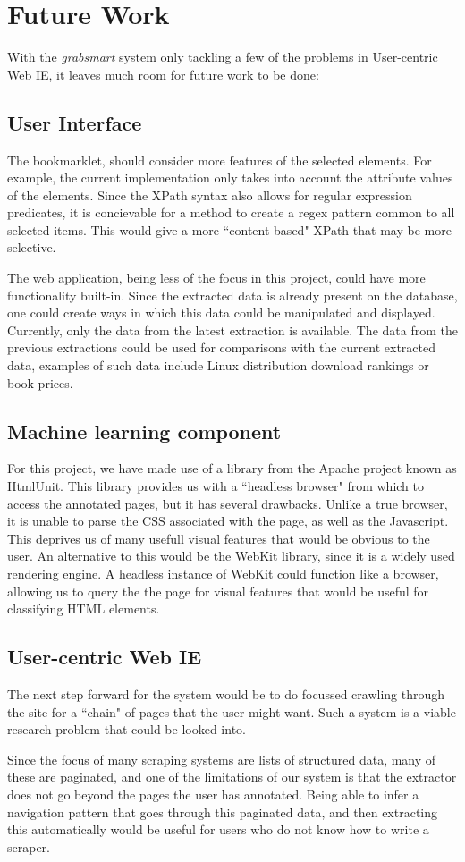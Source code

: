 \section{Future Work}
With the \textit{grabsmart} system only tackling a few of the problems in User-centric Web IE,
it leaves much room for future work to be done:

\subsection{User Interface}
The  bookmarklet, should consider more
features of the selected elements. For example, the current implementation only takes into 
account the attribute values of the elements. Since the XPath syntax also allows for 
regular expression predicates, it is concievable for a method to create
a regex pattern common to all selected items. This would give a more ``content-based" XPath
that may be more selective.

The web application, being less of the focus in this project, could have more functionality
built-in. Since the extracted data is already present on the database, one could create
ways in which this data could be manipulated and displayed. Currently, only the data from
the latest extraction is available. The data from the previous extractions could be used 
for comparisons with the current extracted data, examples of such data include Linux
distribution download rankings or book prices.

\subsection{Machine learning component}
For this project, we have made use of a library from the Apache project known as HtmlUnit.
This library provides us with a ``headless browser" from which to access the annotated pages,
but it has several drawbacks. Unlike a true browser, it is unable to parse the CSS associated
with the page, as well as the Javascript. This deprives us of many usefull visual features
that would be obvious to the user. An alternative to this would be the WebKit library, since
it is a widely used rendering engine. A headless instance of WebKit could function like a
browser, allowing us to query the the page for visual features that would be useful for 
classifying HTML elements.

\subsection{User-centric Web IE}
The next step forward for the system would be to do focussed
crawling through the site for a ``chain" of pages that the user might want.
Such a system is a viable research problem that could be looked into.

Since the focus of many scraping systems are lists of structured data, many of these are
paginated, and one of the limitations of our system is that the extractor does not go
beyond the pages the user has annotated. Being able to infer a navigation pattern that
goes through this paginated data, and then extracting this automatically would be useful
for users who do not know how to write a scraper.



